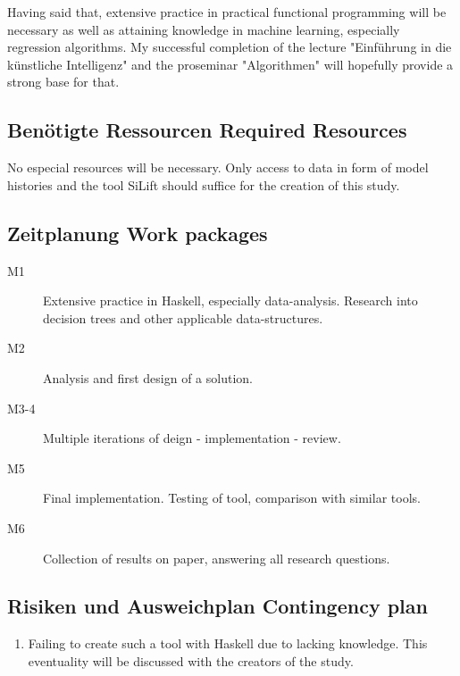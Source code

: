 \documentclass[10pt,a4paper,oneside]{scrartcl}
\begin{document}
	Having said that, extensive practice in practical functional programming will be necessary as well as attaining knowledge in machine learning, especially regression algorithms. My successful completion of the lecture "Einführung in die künstliche Intelligenz" and the proseminar "Algorithmen" will hopefully provide a strong base for that.
	
	\subsection{
		{Benötigte Ressourcen}
		{Required Resources}}
	\label{sub:resources}
	No especial resources will be necessary. Only access to data in form of model histories and the tool SiLift should suffice for the creation of this study.
	
	\subsection{
		{Zeitplanung}
		{Work packages}}
	\label{sub:wp}
	
	
	\begin{description}
		\item[M1] Extensive practice in Haskell, especially data-analysis. Research into decision trees and other applicable data-structures.
		\item[M2] Analysis and first design of a solution.
		\item[M3-4] Multiple iterations of deign - implementation - review.
		\item[M5] Final implementation. Testing of tool, comparison with similar tools.
		\item[M6] Collection of results on paper, answering all research questions.
	\end{description}
	
	\subsection{
		{Risiken und Ausweichplan}
		{Contingency plan}}
	\label{sub:contingency}
	
	
	\begin{enumerate}
		\item Failing to create such a tool with Haskell due to lacking knowledge. This eventuality will be discussed with the creators of the study.
	\end{enumerate}
	
	\nocite{*}
	\printbibliography
	
\end{document}
